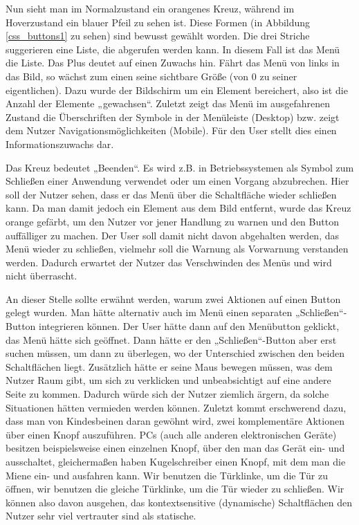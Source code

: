 Nun sieht man im Normalzustand ein orangenes Kreuz, während im Hoverzustand ein blauer Pfeil zu sehen ist. Diese Formen (in Abbildung \ref{css_buttons1} zu sehen) sind bewusst gewählt worden. Die drei Striche suggerieren eine Liste, die abgerufen werden kann. In diesem Fall ist das Menü die Liste. Das Plus deutet auf einen Zuwachs hin. Fährt das Menü von links in das Bild, so wächst zum einen seine sichtbare Größe (von 0 zu seiner eigentlichen). Dazu wurde der Bildschirm um ein Element bereichert, also ist die Anzahl der Elemente „gewachsen“. Zuletzt zeigt das Menü im ausgefahrenen Zustand die Überschriften der Symbole in der Menüleiste (Desktop) bzw. zeigt dem Nutzer Navigationsmöglichkeiten (Mobile). Für den User stellt dies einen Informationszuwachs dar.

Das Kreuz bedeutet „Beenden“. Es wird z.B. in Betriebssystemen als Symbol zum Schließen einer Anwendung verwendet oder um einen Vorgang abzubrechen. Hier soll der Nutzer sehen, dass er das Menü über die Schaltfläche wieder schließen kann. Da man damit jedoch ein Element aus dem Bild entfernt, wurde das Kreuz orange gefärbt, um den Nutzer vor jener Handlung zu warnen und den Button auffälliger zu machen. Der User soll damit nicht davon abgehalten werden, das Menü wieder zu schließen, vielmehr soll die Warnung als Vorwarnung verstanden werden. Dadurch erwartet der Nutzer das Verschwinden des Menüs und wird nicht überrascht.

An dieser Stelle sollte erwähnt werden, warum zwei Aktionen auf einen Button gelegt wurden. Man hätte alternativ auch im Menü einen separaten „Schließen“-Button integrieren können. Der User hätte dann auf den Menübutton geklickt, das Menü hätte sich geöffnet. Dann hätte er den „Schließen“-Button aber erst suchen müssen, um dann zu überlegen, wo der Unterschied zwischen den beiden Schaltflächen liegt. Zusätzlich hätte er seine Maus bewegen müssen, was dem Nutzer Raum gibt, um sich zu verklicken und unbeabsichtigt auf eine andere Seite zu kommen. Dadurch würde sich der Nutzer ziemlich ärgern, da solche Situationen hätten vermieden werden können. Zuletzt kommt erschwerend dazu, dass man von Kindesbeinen daran gewöhnt wird, zwei komplementäre Aktionen über einen Knopf auszuführen. PCs (auch alle anderen elektronischen Geräte) besitzen beispielsweise einen einzelnen Knopf, über den man das Gerät ein- und ausschaltet, gleichermaßen haben Kugelschreiber einen Knopf, mit dem man die Miene ein- und ausfahren kann. Wir benutzen die Türklinke, um die Tür zu öffnen, wir benutzen die gleiche Türklinke, um die Tür wieder zu schließen. Wir können also davon ausgehen, das kontextsensitive (dynamische) Schaltflächen den Nutzer sehr viel vertrauter sind als statische.

